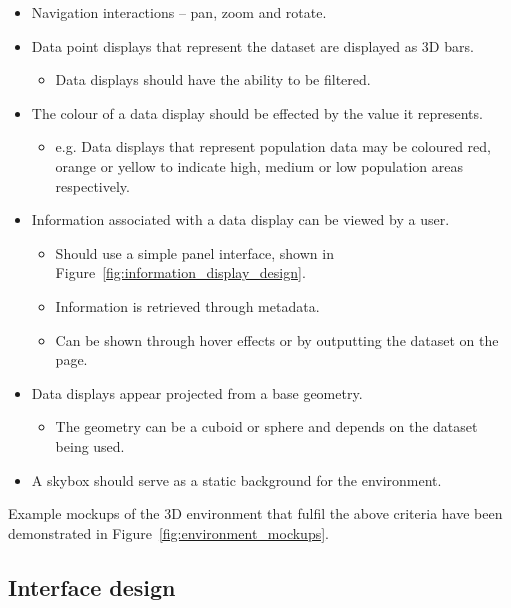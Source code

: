 {{		\begin{itemize}
			\item Navigation interactions -- pan, zoom and rotate.
			\item Data point displays that represent the dataset are displayed as 3D bars.
				\begin{itemize}
					\item Data displays should have the ability to be filtered.
				\end{itemize}
			\item The colour of a data display should be effected by the value it represents.
				\begin{itemize}
					\item e.g. Data displays that represent population data may be coloured red, orange or yellow to indicate high, medium or low population areas respectively.
				\end{itemize}
			\item Information associated with a data display can be viewed by a user.
				\begin{itemize}
					\item Should use a simple panel interface, shown in Figure~\ref{fig:information_display_design}.
					\item Information is retrieved through metadata. 
					\item Can be shown through hover effects or by outputting the dataset on the page.
				\end{itemize}
			\item Data displays appear projected from a base geometry.
				\begin{itemize}
					\item The geometry can be a cuboid or sphere and depends on the dataset being used.
				\end{itemize}
			\item A skybox should serve as a static background for the environment.
		\end{itemize}

		

		Example mockups of the 3D environment that fulfil the above criteria have been demonstrated in Figure~\ref{fig:environment_mockups}.

		

	}

	\subsection{Interface design} {
	\label{sec:interface_design}

}}
